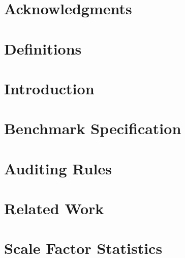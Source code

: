 \documentclass{ldbc}
\begin{document}
\maketitle

\chapter*{Acknowledgments}


\listoffigures
\listoftables
\chapter*{Definitions}


\chapter{Introduction}


\chapter{Benchmark Specification}


%
%
%

\chapter{Auditing Rules}\label{chapter:auditing}


\chapter{Related Work}





\appendix

\chapter{Scale Factor Statistics}

\end{document}
